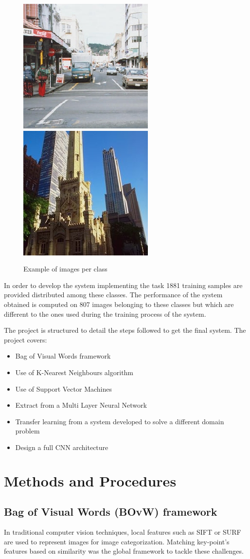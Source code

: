 \documentclass[runningheads]{llncs}
\begin{document}
\begin{figure}
  \includegraphics[width=.2\textwidth]{street.jpg}\hfill
  \includegraphics[width=.2\textwidth]{tallbuilding.jpg}
  \caption{Example of images per class}
\end{figure}

In order to develop the system implementing the task 1881 training samples are provided distributed among these classes. 
The performance of the system obtained is computed on 807 images belonging to these classes but which are different to the ones used during the training process of the system.

The project is structured to detail the steps followed to get the final system. The project covers:
\begin{itemize}
	\item Bag of Visual Words framework
	\item Use of K-Nearest Neighbours algorithm
	\item Use of Support Vector Machines
	\item Extract from a Multi Layer Neural Network
	\item Transfer learning from a system developed to solve a different domain problem
	\item Design a full CNN architecture
\end{itemize}

\section{Methods and Procedures}
\subsection{Bag of Visual Words (BOvW) framework} \label{BOvW}

In traditional computer vision techniques, local features such as SIFT or SURF  are used to represent images for image categorization. Matching key-point's features based on similarity was the global framework to tackle these challenges.
\end{document}
